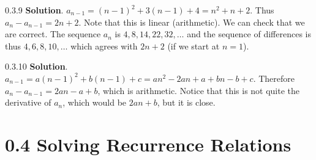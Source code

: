 \documentclass[11pt,]{book}
\theoremstyle{ptxplainnotitle}
\theoremstyle{ptxplaintitle}
\theoremstyle{ptxdefinitionnotitle}
\theoremstyle{ptxdefinitiontitle}
\theoremstyle{ptxdefinitionnotitle}
\theoremstyle{ptxdefinitiontitle}
\theoremstyle{ptxdefinitionnotitle}
\theoremstyle{ptxdefinitiontitle}
\theoremstyle{ptxdefinitiontitlenonumber}
\theoremstyle{ptxdefinitiontitlenonumber}
\numberwithin{equation}{chapter}
\begin{document}
\begin{divisionexercise}{0.3.9}
\textbf{Solution}.\quad%
\hypertarget{p-424}{}%
\(a_{n-1} = (n-1)^2 + 3(n-1) + 4 = n^2 + n + 2\text{.}\) Thus \(a_n - a_{n-1} = 2n+2\text{.}\) Note that this is linear (arithmetic). We can check that we are correct. The sequence \(a_n\) is \(4, 8, 14, 22, 32, \ldots\) and the sequence of differences is thus \(4, 6, 8, 10,\ldots\) which agrees with \(2n+2\) (if we start at \(n = 1\)).%
\end{divisionexercise}%
\begin{divisionexercise}{0.3.10}
\textbf{Solution}.\quad%
\hypertarget{p-426}{}%
\(a_{n-1} = a(n-1)^2 + b(n-1) + c = an^2 - 2an + a + bn - b + c\). Therefore \(a_n - a_{n-1} = 2an - a + b\), which is arithmetic. Notice that this is not quite the derivative of \(a_n\), which would be \(2an + b\), but it is close.%
\end{divisionexercise}%
\section*{0.4 Solving Recurrence Relations}
\end{document}
